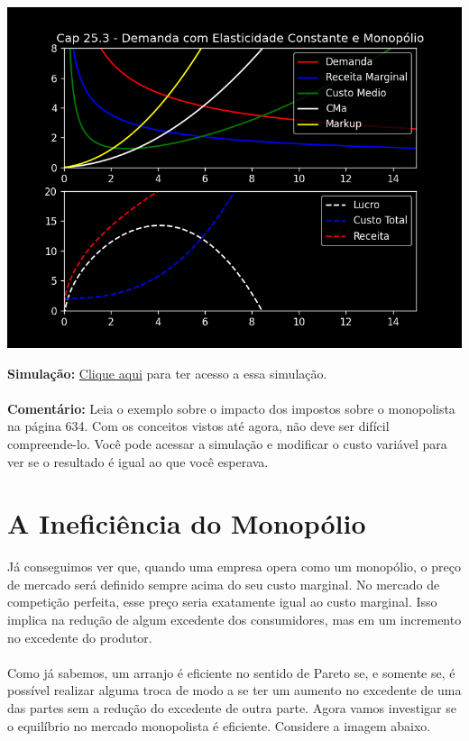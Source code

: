 \documentclass[a4paper,11pt,oneside]{book}
\theoremstyle{definition}
\theoremstyle{break}
\begin{document}
\begin{center}
\includegraphics[scale=0.7]{cap25_3-demanda_ces_e_monopolio.png}
\end{center}

\textbf{Simulação:} \href{https://colab.research.google.com/drive/1MRJb9DZ7n_Hz2Kp9ng8K7pOcb1DTy_u5?usp=sharing}{Clique aqui} para ter acesso a essa simulação.
\\~\\
\textbf{Comentário:} Leia o exemplo sobre o impacto dos impostos sobre o monopolista na página 634. Com os conceitos vistos até agora, não deve ser difícil compreende-lo. Você pode acessar a simulação e modificar o custo variável para ver se o resultado é igual ao que você esperava.

\section{A Ineficiência do Monopólio}

Já conseguimos ver que, quando uma empresa opera como um monopólio, o preço de mercado será definido sempre acima do seu custo marginal. No mercado de competição perfeita, esse preço seria exatamente igual ao custo marginal. Isso implica na redução de algum excedente dos consumidores, mas em um incremento no excedente do produtor.
\\~\\
Como já sabemos, um arranjo é eficiente no sentido de Pareto se, e somente se, é possível realizar alguma troca de modo a se ter um aumento no excedente de uma das partes sem a redução do excedente de outra parte. Agora vamos investigar se o equilíbrio no mercado monopolista é eficiente. Considere a imagem abaixo.
\end{document}
